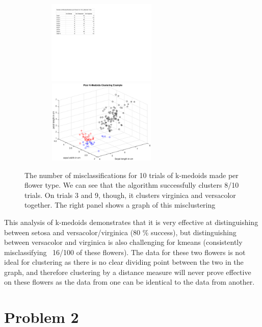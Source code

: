 \documentclass{article}
\begin{document}
    
    \begin{figure}[h!]
    \centerline
    {
    \includegraphics[width=8cm, height=4cm] {num_miscl_kmedoids} \includegraphics[width=8cm, height=4cm]{bad_k_medoids_cluster}
    }
    \caption{\label{fig:my figure} The number of misclassifications for 10 trials of k-medoids made per flower type.  We can see that the algorithm successfully clusters 8/10 trials. On trials 3 and 9, though, it clusters virginica and versacolor together.  The right panel shows a graph of this misclustering }
    \end{figure}
    
    This analysis of k-medoids demonstrates that it is very effective at distinguishing between setosa and versacolor/virginica (80 \% success), but distinguishing between versacolor and virginica is also challenging for kmeans (consistently misclassifying ~16/100 of these flowers).  The data for these two flowers is not ideal for clustering as there is no clear dividing point between the two in the graph, and therefore clustering by a distance measure will never prove effective on these flowers as the data from one can be identical to the data from another.
    
    
\bigskip


\section*{Problem 2}
\end{document}
